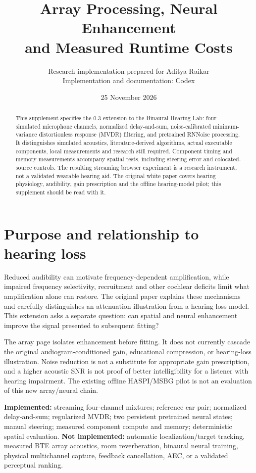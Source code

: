 \documentclass[11pt,a4paper]{article}
\title{Array Processing, Neural Enhancement\\and Measured Runtime Costs}
\author{Research implementation prepared for Aditya Raikar\\Implementation and documentation: Codex}
\date{25 November 2026}
\begin{document}
\maketitle
\begin{abstract}
This supplement specifies the 0.3 extension to the Binaural Hearing Lab: four simulated microphone channels, normalized delay-and-sum, noise-calibrated minimum-variance distortionless response (MVDR) filtering, and pretrained RNNoise processing. It distinguishes simulated acoustics, literature-derived algorithms, actual executable components, local measurements and research still required. Component timing and memory measurements accompany spatial tests, including steering error and colocated-source controls. The resulting streaming browser experiment is a research instrument, not a validated wearable hearing aid. The original white paper covers hearing physiology, audibility, gain prescription and the offline hearing-model pilot; this supplement should be read with it.
\end{abstract}
\section{Purpose and relationship to hearing loss}
Reduced audibility can motivate frequency-dependent amplification, while impaired frequency selectivity, recruitment and other cochlear deficits limit what amplification alone can restore. The original paper explains these mechanisms and carefully distinguishes an attenuation illustration from a hearing-loss model. This extension asks a separate question: can spatial and neural enhancement improve the signal presented to subsequent fitting?

The array page isolates enhancement before fitting. It does not currently cascade the original audiogram-conditioned gain, educational compression, or hearing-loss illustration. Noise reduction is not a substitute for appropriate gain prescription, and a higher acoustic SNR is not proof of better intelligibility for a listener with hearing impairment. The existing offline HASPI/MSBG pilot is not an evaluation of this new array/neural chain.

\textbf{Implemented:} streaming four-channel mixtures; reference ear pair; normalized delay-and-sum; regularized MVDR; two persistent pretrained neural states; manual steering; measured component compute and memory; deterministic spatial evaluation. \textbf{Not implemented:} automatic localization/target tracking, measured BTE array acoustics, room reverberation, binaural neural training, physical multichannel capture, feedback cancellation, AEC, or a validated perceptual ranking.
\end{document}
